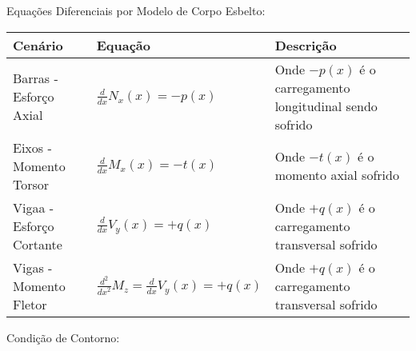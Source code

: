 \documentclass{article}
\begin{document}
        Equações Diferenciais por Modelo de Corpo Esbelto:

        \begin{table}[h]\tiny
            
        \begin{tabularx}{\textwidth}{|X|X|X|}\hline
                \textbf{Cenário} & \textbf{Equação} & \textbf{Descrição}\\ \hline
                \rule{0pt}{4ex} Barras - Esforço Axial & $\frac{d}{dx}N_x(x) = -p(x)$ & Onde $-p(x)$ é o carregamento longitudinal sendo sofrido \\[2ex]  \hline
                \rule{0pt}{4ex} Eixos - Momento Torsor   & $\frac{d}{dx}M_x(x) = -t(x)$ & Onde $-t(x)$ é o momento axial sofrido \\[2ex]\hline
                \rule{0pt}{4ex} Vigaa - Esforço Cortante & $\frac{d}{dx}V_y(x) = +q(x)$ & Onde $+q(x)$ é o carregamento transversal sofrido \\[2ex] \hline
                \rule{0pt}{4ex} Vigas - Momento Fletor & $\frac{d^2}{dx^2}M_z = \frac{d}{dx}V_y(x) = +q(x)$ & Onde $+q(x)$ é o carregamento transversal sofrido \\[2ex] \hline
        \end{tabularx}

        \end{table}
        Condição de Contorno:

        
\end{document}
